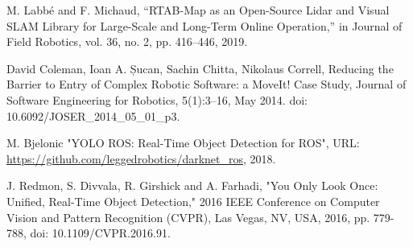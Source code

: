 \documentclass[conference,a4paper]{IEEEtran}
\begin{document}
%
%
%
\begin{thebibliography}{1}

M. Labbé and F. Michaud, “RTAB-Map as an Open-Source Lidar and Visual SLAM Library for Large-Scale and Long-Term Online Operation,” in Journal of Field Robotics, vol. 36, no. 2, pp. 416–446, 2019. 

David Coleman, Ioan A. Șucan, Sachin Chitta, Nikolaus Correll, Reducing the Barrier to Entry of Complex Robotic Software: a MoveIt! Case Study, Journal of Software Engineering for Robotics, 5(1):3–16, May 2014. doi: 10.6092/JOSER\_2014\_05\_01\_p3.

M. Bjelonic "YOLO ROS: Real-Time Object Detection for ROS", URL: \url{https://github.com/leggedrobotics/darknet_ros}, 2018.

J. Redmon, S. Divvala, R. Girshick and A. Farhadi, "You Only Look Once: Unified, Real-Time Object Detection," 2016 IEEE Conference on Computer Vision and Pattern Recognition (CVPR), Las Vegas, NV, USA, 2016, pp. 779-788, doi: 10.1109/CVPR.2016.91.

\end{thebibliography}




\end{document}
